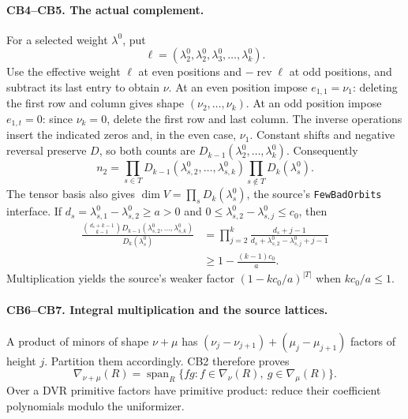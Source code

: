 \documentclass[11pt,a4paper]{article}
\numberwithin{equation}{section}
\theoremstyle{remark}\newtheorem{remark}[theorem]{Remark}
\begin{document}
\paragraph{CB4--CB5. The actual complement.}
For a selected weight $\lambda^0$, put
\[
 \ell=(\lambda^0_2,\lambda^0_2,\lambda^0_3,\ldots,\lambda^0_k).
\]
Use the effective weight $\ell$ at even positions and $-\operatorname{rev}\ell$ at odd positions, and subtract its last entry to obtain $\nu$.
At an even position impose $e_{1,1}=\nu_1$: deleting the first row and column gives shape $(\nu_2,\ldots,\nu_k)$.
At an odd position impose $e_{1,t}=0$: since $\nu_k=0$, delete the first row and last column.
The inverse operations insert the indicated zeros and, in the even case, $\nu_1$.
Constant shifts and negative reversal preserve $D$, so both counts are $D_{k-1}(\lambda^0_2,\ldots,\lambda^0_k)$.
Consequently
\[
 n_2=\prod_{s\in T}D_{k-1}(\lambda^0_{s,2},\ldots,\lambda^0_{s,k})
       \prod_{s\notin T}D_k(\lambda^0_s). \tag{CB.3}
\]
The tensor basis also gives $\dim V=\prod_sD_k(\lambda^0_s)$, the source's \texttt{FewBadOrbits} interface.
If $d_s=\lambda^0_{s,1}-\lambda^0_{s,2}\ge a>0$ and
$0\le\lambda^0_{s,2}-\lambda^0_{s,j}\le c_0$, then
\[
\begin{aligned}
 \frac{\binom{d_s+k-1}{k-1}D_{k-1}(\lambda^0_{s,2},\ldots,\lambda^0_{s,k})}{D_k(\lambda^0_s)}
 &=\prod_{j=2}^k\frac{d_s+j-1}{d_s+\lambda^0_{s,2}-\lambda^0_{s,j}+j-1}\\
 &\ge1-\frac{(k-1)c_0}{a}.
\end{aligned}
\]
Multiplication yields the source's weaker factor $(1-kc_0/a)^{|T|}$ when $kc_0/a\le1$.

\paragraph{CB6--CB7. Integral multiplication and the source lattices.}\cite{complement-cartan}
A product of minors of shape $\nu+\mu$ has
$(\nu_j-\nu_{j+1})+(\mu_j-\mu_{j+1})$ factors of height $j$.
Partition them accordingly. CB2 therefore proves
\[
 \nabla_{\nu+\mu}(R)=\operatorname{span}_R
 \{fg:f\in\nabla_\nu(R),\ g\in\nabla_\mu(R)\}. \tag{CB.4}
\]
Over a DVR primitive factors have primitive product: reduce their coefficient polynomials modulo the uniformizer.
\end{document}
